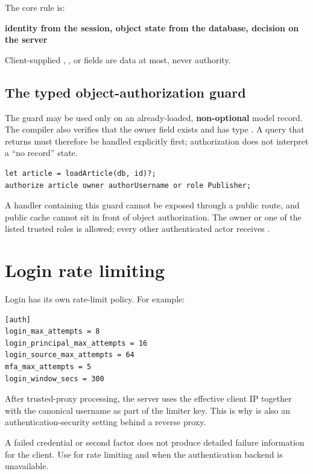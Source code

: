The core rule is:

\begin{center}
\textbf{identity from the session, object state from the database, decision on the server}
\end{center}

Client-supplied , , or  fields are data at most, never authority.

\subsection*{The typed object-authorization guard}

The  guard may be used only on an already-loaded, \textbf{non-optional} model record. The compiler also verifies that the owner field exists and has type . A query that returns  must therefore be handled explicitly first; authorization does not interpret a ``no record'' state.

\begin{lstlisting}[language=Velran]
let article = loadArticle(db, id)?;
authorize article owner authorUsername or role Publisher;
\end{lstlisting}

A handler containing this guard cannot be exposed through a public route, and public cache cannot sit in front of object authorization. The owner or one of the listed trusted roles is allowed; every other authenticated actor receives .

\section{Login rate limiting}

Login has its own rate-limit policy. For example:

\begin{lstlisting}
[auth]
login_max_attempts = 8
login_principal_max_attempts = 16
login_source_max_attempts = 64
mfa_max_attempts = 5
login_window_secs = 300
\end{lstlisting}

After trusted-proxy processing, the server uses the effective client IP together with the canonical username as part of the limiter key. This is why  is also an authentication-security setting behind a reverse proxy.

A failed credential or second factor does not produce detailed failure information for the client. Use  for rate limiting and  when the authentication backend is unavailable.

